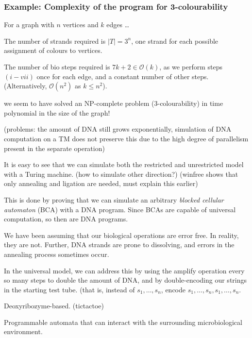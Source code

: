 \documentclass{beamer}
\begin{document}
\begin{frame}
\frametitle{Example: Complexity of the program for 3-colourability}

For a graph with $n$ vertices and $k$ edges \ldots

The number of strands required is $\lvert T \rvert = 3^n$, one strand for each possible assignment of colours to vertices.

The number of bio steps required is $7k + 2 \in \mathcal{O}(k)$, as we perform steps $(i - vii)$ once for each edge, and a constant number of other steps. (Alternatively, $\mathcal{O}(n^2)$ as $k \leq n^2$).
\end{frame}


\begin{frame}

we seem to have solved an NP-complete problem (3-colourability) in time polynomial in the size of the graph!

(problems: the amount of DNA still grows exponentially, simulation of DNA computation on a TM does not preserve this due to the high degree of parallelism present in the separate operation)

\end{frame}


\begin{frame}
It is easy to see that we can simulate both the restricted and unrestricted model with a Turing machine. (how to simulate other direction?) (winfree shows that only annealing and ligation are needed, must explain this earlier)

This is done by proving that we can simulate an arbitrary \emph{blocked cellular automaton} (BCA) with a DNA program. Since BCAs are capable of universal computation, so then are DNA programs.

\end{frame}




We have been assuming that our biological operations are error free. In reality, they are not. Further, DNA strands are prone to dissolving, and errors in the annealing process sometimes occur.

In the universal model, we can address this by using the amplify operation every so many steps to double the amount of DNA, and by double-encoding our strings in the starting test tube. (that is, instead of $s_1,\ldots,s_n$, encode $s_1,\ldots,s_n,s_1,\ldots,s_n$.





Deoxyribozyme-based. (tictactoe)

Programmable automata that can interact with the surrounding microbiological environment.
\end{document}
